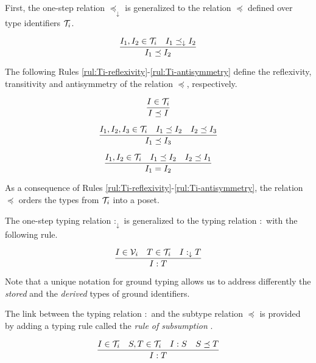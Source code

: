 \documentclass[runningheads]{llncs}
\newcommand{\darr}{\downarrow}
\newcommand{\V}{{\cal V}}
\newcommand{\T}{{\cal T}}
\begin{document}
First, the one-step relation $\preceq_\darr$ is generalized to the
relation $\preceq$ defined over type identifiers $\T_i$.

\begin{equation}
\label{rul:Ic-extended}
\dfrac{I_1,I_2\in\T_i \quad I_1\preceq_\darr\/I_2}
      {I_1 \preceq I_2}
\end{equation}

The following Rules \ref{rul:Ti-reflexivity}-\ref{rul:Ti-antisymmetry}
define the reflexivity, transitivity and antisymmetry of the
relation $\preceq$, respectively.

\begin{equation}
\label{rul:Ti-reflexivity}
\dfrac{I\in\T_i}
      {I\preceq\/I}
\end{equation}

\begin{equation}
\label{rul:Ti-transitivity}
\dfrac{I_1,I_2,I_3\in\T_i\quad\/I_1\preceq\/I_2\quad\/I_2\preceq\/I_3}
      {I_1\preceq\/I_3}   
\end{equation}

\begin{equation}
\label{rul:Ti-antisymmetry}
\dfrac{I_1,I_2\in\T_i \quad I_1\preceq\/I_2 \quad I_2\preceq\/I_1}
      {I_1=I_2}   
\end{equation}

\noindent
As a consequence of Rules
\ref{rul:Ti-reflexivity}-\ref{rul:Ti-antisymmetry}, the relation
$\preceq$ orders the types from $\T_i$ into a poset.

The one-step typing relation $:_\darr$ is generalized to the typing
relation $:$ with the following rule.

\begin{equation}
\dfrac{I\in\V_i\quad\/T\in\T_i\quad\/I:_\darr\/T}
      {I:T}
\end{equation}

Note that a unique notation for ground typing allows us to address
differently the \emph{stored} and the \emph{derived} types of ground
identifiers.

The link between the typing relation $:$ and the subtype relation
$\preceq$ is provided by adding a typing rule called the \emph{rule of
  subsumption} \cite{Pierce2002}.

\begin{equation}
\label{rul:typing-subsumption}
\dfrac{I\in\T_i\quad\/S,T\in\T_i\quad\/I:S\quad\/S\preceq\/T}
      {I:T}    
\end{equation}
\end{document}
